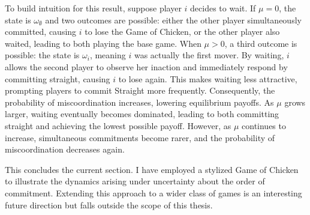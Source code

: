 \documentclass[../paper.tex]{subfiles}
\begin{document}
\newline
To build intuition for this result, suppose player $i$ decides to wait. If $\mu = 0$, the state is $\omega_\emptyset$ and two outcomes are possible: either the other player simultaneously committed, causing $i$ to lose the Game of Chicken, or the other player also waited, leading to both playing the base game. When $\mu > 0$, a third outcome is possible: the state is $\omega_i$, meaning $i$ was actually the first mover. By waiting, $i$ allows the second player to observe her inaction and immediately respond by committing straight, causing $i$ to lose again. This makes waiting less attractive, prompting players to commit Straight more frequently. Consequently, the probability of miscoordination increases, lowering equilibrium payoffs. As $\mu$ grows larger, waiting eventually becomes dominated, leading to both committing straight and achieving the lowest possible payoff. However, as $\mu$ continues to increase, simultaneous commitments become rarer, and the probability of miscoordination decreases again.
 
This concludes the current section. I have employed a stylized Game of Chicken to illustrate the dynamics arising under uncertainty about the order of commitment. Extending this approach to a wider class of games is an interesting future direction but falls outside the scope of this thesis.
 
\end{document}
